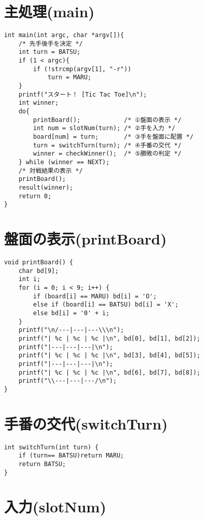 \documentclass[uplatex,a4paper,11pt,oneside,openany]{jsbook}
\begin{document}
\section{主処理(main)}

\begin{lstlisting}[]
int main(int argc, char *argv[]){
    /* 先手後手を決定 */
    int turn = BATSU;
    if (1 < argc){
        if (!strcmp(argv[1], "-r"))
            turn = MARU;
    }
    printf("スタート！ [Tic Tac Toe]\n");
    int winner;
    do{
        printBoard();            /* ①盤面の表示 */
        int num = slotNum(turn); /* ②手を入力 */
        board[num] = turn;       /* ③手を盤面に配置 */
        turn = switchTurn(turn); /* ④手番の交代 */
        winner = checkWinner();  /* ⑤勝敗の判定 */
    } while (winner == NEXT);
    /* 対戦結果の表示 */
    printBoard();
    result(winner);
    return 0;
}
\end{lstlisting}

\section{盤面の表示(printBoard)}

\begin{lstlisting}
void printBoard() {
    char bd[9];
    int i;
    for (i = 0; i < 9; i++) {
        if (board[i] == MARU) bd[i] = 'O';
        else if (board[i] == BATSU) bd[i] = 'X';
        else bd[i] = '0' + i;
    }
    printf("\n/---|---|---\\\n");
    printf("| %c | %c | %c |\n", bd[0], bd[1], bd[2]);
    printf("|---|---|---|\n");
    printf("| %c | %c | %c |\n", bd[3], bd[4], bd[5]);
    printf("|---|---|---|\n");
    printf("| %c | %c | %c |\n", bd[6], bd[7], bd[8]);
    printf("\\---|---|---/\n");
}
\end{lstlisting}

\section{手番の交代(switchTurn)}

\begin{lstlisting}
int switchTurn(int turn) {
    if (turn== BATSU)return MARU;
    return BATSU;
}
\end{lstlisting}

\section{入力(slotNum)}
\end{document}
